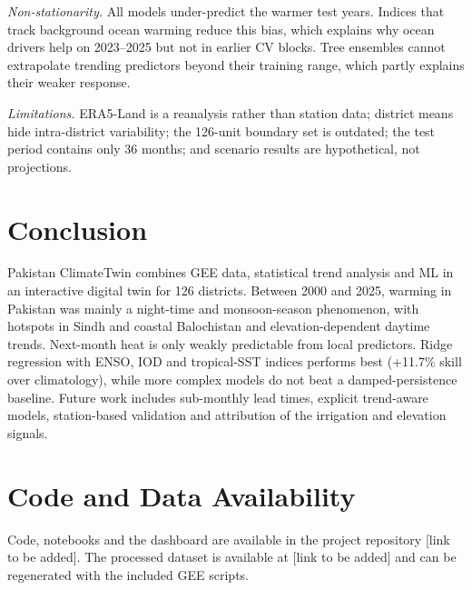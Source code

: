 \documentclass[conference]{IEEEtran}
\begin{document}
\textit{Non-stationarity.} All models under-predict the warmer test years. Indices that track background ocean warming reduce this bias, which explains why ocean drivers help on 2023--2025 but not in earlier CV blocks. Tree ensembles cannot extrapolate trending predictors beyond their training range, which partly explains their weaker response.

\textit{Limitations.} ERA5-Land is a reanalysis rather than station data; district means hide intra-district variability; the 126-unit boundary set is outdated; the test period contains only 36 months; and scenario results are hypothetical, not projections.

\section{Conclusion}
Pakistan ClimateTwin combines GEE data, statistical trend analysis and ML in an interactive digital twin for 126 districts. Between 2000 and 2025, warming in Pakistan was mainly a night-time and monsoon-season phenomenon, with hotspots in Sindh and coastal Balochistan and elevation-dependent daytime trends. Next-month heat is only weakly predictable from local predictors. Ridge regression with ENSO, IOD and tropical-SST indices performs best (+11.7\% skill over climatology), while more complex models do not beat a damped-persistence baseline. Future work includes sub-monthly lead times, explicit trend-aware models, station-based validation and attribution of the irrigation and elevation signals.

\section*{Code and Data Availability}
Code, notebooks and the dashboard are available in the project repository [link to be added]. The processed dataset is available at [link to be added] and can be regenerated with the included GEE scripts.
\end{document}
